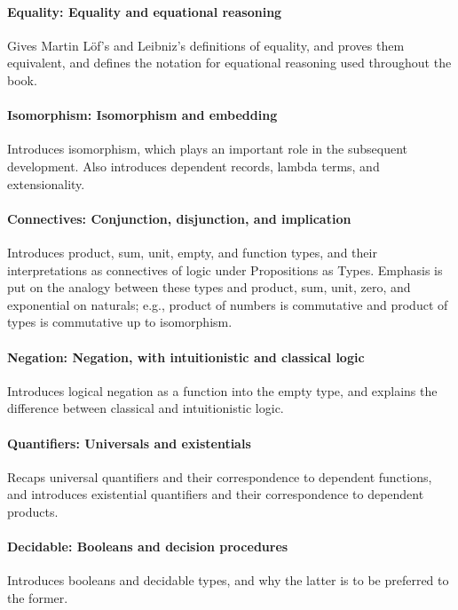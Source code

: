 \documentclass[preprint,authoryear]{elsarticle}
\begin{document}
\paragraph{Equality: Equality and equational reasoning}
Gives Martin L\"of's and Leibniz's definitions of equality, and proves
them equivalent, and defines the notation for equational reasoning used
throughout the book.

\paragraph{Isomorphism: Isomorphism and embedding}
Introduces isomorphism, which plays an important role in the
subsequent development.  Also introduces dependent records, lambda
terms, and extensionality.

\paragraph{Connectives: Conjunction, disjunction, and implication}
Introduces product, sum, unit, empty, and function types, and their
interpretations as connectives of logic under Propositions as Types.
Emphasis is put on the analogy between these types and product, sum,
unit, zero, and exponential on naturals; e.g., product of numbers is
commutative and product of types is commutative up to isomorphism.

\paragraph{Negation: Negation, with intuitionistic and classical logic}
Introduces logical negation as a function into the empty
type, and explains the difference between classical and intuitionistic
logic.

\paragraph{Quantifiers: Universals and existentials}
Recaps universal quantifiers and their correspondence to dependent
functions, and introduces existential quantifiers and their
correspondence to dependent products.

\paragraph{Decidable: Booleans and decision procedures}
Introduces booleans and decidable types, and why the latter is to be
preferred to the former.
\end{document}
